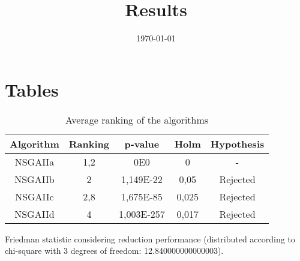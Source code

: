 \documentclass{article}
\title{Results}
\author{}
\date{\today}
\begin{document}
\oddsidemargin 0in \topmargin 0in\maketitle

\section{Tables}
\begin{table}[!htp]
\centering
\begin{tabular}{c|c|c|c|c}
Algorithm&Ranking&p-value&Holm&Hypothesis\\
\hline
NSGAIIa & 1,2 & 0E0 & 0 & -\\
NSGAIIb & 2 & 1,149E-22 & 0,05 & Rejected\\
NSGAIIc & 2,8 & 1,675E-85 & 0,025 & Rejected\\
NSGAIId & 4 & 1,003E-257 & 0,017 & Rejected\\
\end{tabular}
\caption{Average ranking of the algorithms}
\end{table}


Friedman statistic considering reduction performance (distributed according to chi-square with 3 degrees of freedom: 12.840000000000003).
\end{document}
